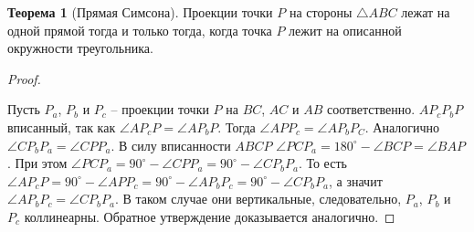 \documentclass[12pt]{article}
\theoremstyle{definition}
\newtheorem{theorem}{Теорема}[section]
\begin{document}
    \begin{theorem}[Прямая Симсона]
        Проекции точки $P$ на стороны $\triangle ABC$ лежат на одной прямой тогда и только тогда, когда точка $P$ лежит на описанной окружности треугольника.
    \end{theorem}
    \begin{proof}
    $ $\par\nobreak\ignorespaces
        \begin{center}
        \end{center}
        Пусть $P_a$, $P_b$ и $P_c$ -- проекции точки $P$ на $BC$, $AC$ и $AB$ соответственно. $AP_cP_bP$ вписанный, так как $\angle AP_cP=\angle AP_bP$. Тогда $\angle APP_c=\angle AP_bP_C$. Аналогично $\angle CP_bP_a=\angle CPP_a$. В силу вписанности $ABCP$ $\angle PCP_a=180^{\circ}-\angle BCP=\angle BAP$. При этом $\angle PCP_a=90^{\circ}-\angle CPP_a=90^{\circ}-\angle CP_bP_a$. То есть $\angle AP_cP=90^{\circ}-\angle APP_c=90^{\circ}-\angle AP_bP_c=90^{\circ}-\angle CP_bP_a$, а значит $\angle AP_bP_c=\angle CP_bP_a$. В таком случае они вертикальные, следовательно, $P_a$, $P_b$ и $P_c$ коллинеарны. Обратное утверждение доказывается аналогично.
    \end{proof}
\end{document}
